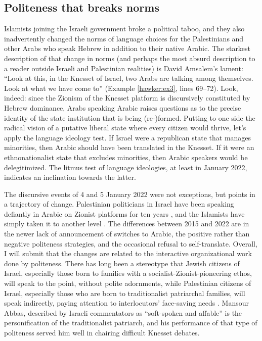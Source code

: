 \documentclass[output=paper,arabicfont]{langscibook}
\begin{document}
\subsection{Politeness that breaks norms}

Islamists joining the Israeli government broke a political taboo, and they also inadvertently changed the norms of language choices for the Palestinians and other Arabs who speak Hebrew in addition to their native Arabic. The starkest description of that change in norms (and perhaps the most absurd description to a reader outside Israeli and Palestinian realities) is David Amsalem’s lament: “Look at this, in the Knesset of Israel, two Arabs are talking among themselves. Look at what we have come to” (Example \ref{hawker:ex3}, lines 69–72). Look, indeed: since the Zionism of the Knesset platform is discursively constituted by Hebrew dominance, Arabs speaking Arabic raises questions as to the precise identity of the state institution that is being (re-)formed. Putting to one side the radical vision of a putative liberal state where every citizen would thrive, let’s apply the language ideology test. If Israel were a republican state that manages minorities, then Arabic should have been translated in the Knesset. If it were an ethnonationalist state that excludes minorities, then Arabic speakers would be delegitimized. The litmus test of language ideologies, at least in January 2022, indicates an inclination towards the latter.

The discursive events of 4 and 5 January 2022 were not exceptions, but points in a trajectory of change. Palestinian politicians in Israel have been speaking defiantly in Arabic on Zionist platforms for ten years \citep[39–50]{hawker2019a}, and the Islamists have simply taken it to another level \citep{leal2022a}. The differences between 2015 and 2022 are in the newer lack of announcement of switches to Arabic, the positive rather than negative politeness strategies, and the occasional refusal to self-translate. Overall, I will submit that the changes are related to the interactive organizational work done by politeness. There has long been a stereotype that Jewish citizens of Israel, especially those born to families with a socialist-Zionist-pioneering ethos, will speak to the point, without polite adornments, while Palestinian citizens of Israel, especially those who are born to traditionalist patriarchal families, will speak indirectly, paying attention to interlocutors’ face-saving needs \citep{katriel1986a}. Mansour Abbas, described by Israeli commentators as “soft-spoken and affable” \citep{karsh2022a} is the personification of the traditionalist patriarch, and his performance of that type of politeness served him well in chairing difficult Knesset debates.
\end{document}

